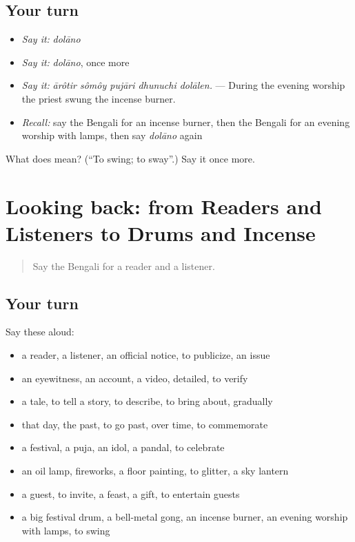 \subsection*{Your turn}
\begin{itemize}
\raggedright
  \item \emph{Say it:} \emph{dolāno}
  \item \emph{Say it:} \emph{dolāno}, once more
  \item \emph{Say it:} \emph{ārôtir sômôy pujāri dhunuchi dolālen.} — During the evening worship the priest swung the incense burner.
  \item \emph{Recall:} say the Bengali for an incense burner, then the Bengali for an evening worship with lamps, then say \emph{dolāno} again
\end{itemize}

\begin{tcolorbox}[breakable,colback=teal!4,colframe=teal!35!black,title={Before you move on}]
What does  mean? (\textquotedblleft{}To swing; to sway\textquotedblright{}.) Say it once more.
\end{tcolorbox}
\section[(dialogue)]{Looking back: from Readers and Listeners to Drums and Incense}

\label{lesson:BN-R307-review-300-307}



\begin{quote}
Say the Bengali for a reader and a listener.
\end{quote}

\subsection*{Your turn}
Say these aloud:

\begin{itemize}
\raggedright
  \item a reader, a listener, an official notice, to publicize, an issue
  \item an eyewitness, an account, a video, detailed, to verify
  \item a tale, to tell a story, to describe, to bring about, gradually
  \item that day, the past, to go past, over time, to commemorate
  \item a festival, a puja, an idol, a pandal, to celebrate
  \item an oil lamp, fireworks, a floor painting, to glitter, a sky lantern
  \item a guest, to invite, a feast, a gift, to entertain guests
  \item a big festival drum, a bell-metal gong, an incense burner, an evening worship with lamps, to swing
\end{itemize}

